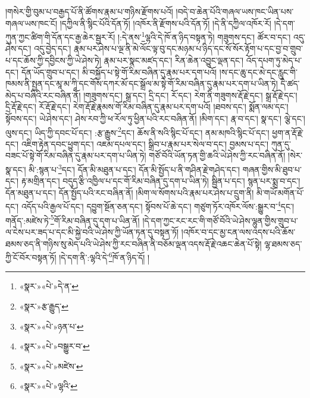 །གསེར་གྱི་བུམ་པ་བརྒྱད་པོ་ནི་ཚོགས་རྣམ་པ་གཉིས་རྫོགས་པའོ། །བདེ་བ་ཆེན་པོའི་གཞལ་ཡས་ཁང་ཡིན་པས་གཞལ་ཡས་ཁང་ངོ། །དཀྱིལ་ནི་སྙིང་པོའི་དོན་ཏོ། །འཁོར་ནི་རྫོགས་པའི་དོན་ཏོ། །དེ་ནི་དཀྱིལ་འཁོར་རོ། །དེ་དག་ཀུན་ཀྱང་ཚིག་གི་དོན་དང་རྒྱ་ཆེར་སྦྱར་རོ། །:དེ་ནས་\footnote{«སྣར་»«པེ་»དེ་ན་}ལྷའི་དེ་ཁོ་ན་ཉིད་བསྟན་ཏེ། གཟུགས་དང་། ཚོར་བ་དང་། འདུ་ཤེས་དང་། འདུ་བྱེད་དང་། རྣམ་པར་ཤེས་པ་ལྔ་ནི་མེ་ལོང་ལྟ་བུ་དང་མཉམ་པ་ཉིད་དང་སོ་སོར་རྟོག་པ་དང་བྱ་བ་གྲུབ་པ་དང་ཆོས་ཀྱི་དབྱིངས་ཀྱི་ཡེ་ཤེས་ཏེ། རྣམ་པར་སྣང་མཛད་དང་། རིན་ཆེན་འབྱུང་ལྡན་དང་། འོད་དཔག་ཏུ་མེད་པ་དང་། དོན་ཡོད་གྲུབ་པ་དང་། མི་བསྐྱོད་པ་སྟེ་གོ་རིམ་བཞིན་དུ་རྣམ་པར་དག་པའོ། །ས་དང་ཆུ་དང་མེ་དང་རླུང་གི་ཁམས་ནི་སྤྱན་དང་མཱ་མ་ཀཱི་དང་གོས་དཀར་མོ་དང་སྒྲོལ་མ་སྟེ་གོ་རིམ་བཞིན་དུ་རྣམ་པར་དག་པ་ཡིན་ཏེ། དེ་ཚད་མེད་པ་བཞིའི་རང་བཞིན་ནོ། །གཟུགས་དང་། སྒྲ་དང་། དྲི་དང་། རོ་དང་། རེག་ནི་གཟུགས་རྡོ་རྗེ་དང་། སྒྲ་རྡོ་རྗེ་དང་། དྲི་རྡོ་རྗེ་དང་། རོ་རྡོ་རྗེ་དང་། རེག་རྡོ་རྗེ་རྣམས་གོ་རིམ་བཞིན་དུ་རྣམ་པར་དག་པའོ། །ཐབས་དང་། སྨོན་ལམ་དང་། སྟོབས་དང་། ཡེ་ཤེས་དང་། ཤེས་རབ་ཀྱི་ཕ་རོལ་ཏུ་ཕྱིན་པའི་རང་བཞིན་ནོ། །མིག་དང་། རྣ་བ་དང་། སྣ་དང་། ལྕེ་དང་། ལུས་དང་། ཡིད་ཀྱི་དབང་པོ་དང་། :རྩ་རྒྱུས་\footnote{«སྣར་»རྩ་རྒྱུད་}དང་། ཆོས་ནི་སའི་སྙིང་པོ་དང་། ནམ་མཁའི་སྙིང་པོ་དང་། ཕྱག་ན་རྡོ་རྗེ་དང་། འཇིག་རྟེན་དབང་ཕྱུག་དང་། འཇམ་དཔལ་དང་། སྒྲིབ་པ་རྣམ་པར་སེལ་བ་དང་། བྱམས་པ་དང་། ཀུན་དུ་བཟང་པོ་སྟེ་གོ་རིམ་བཞིན་དུ་རྣམ་པར་དག་པ་ཡིན་ཏེ། གཙོ་བོའི་ཡོན་ཏན་གྱི་ཆའི་ཡེ་ཤེས་ཀྱི་རང་བཞིན་ནོ། །སེར་སྣ་དང་། མི་:སྙན་པ་\footnote{«སྣར་»«པེ་»ཉན་པ་}དང་། དོན་མི་མཐུན་པ་དང་། དོན་མི་སྤྱོད་པ་ནི་གཤིན་རྗེ་གཤེད་དང་། གཞན་གྱིས་མི་ཐུབ་པ་དང་། རྟ་མགྲིན་དང་། བདུད་རྩི་འཁྱིལ་པ་དང་གོ་རིམ་བཞིན་དུ་དག་པ་ཡིན་ཏེ། སྦྱིན་པ་དང་། སྙན་པར་སྨྲ་བ་དང་། དོན་མཐུན་པ་དང་། དོན་སྤྱོད་པའི་རང་བཞིན་ནོ། །མིག་ལ་སོགས་པའི་རྣམ་པར་ཤེས་པ་དྲུག་ནི། མི་གཡོ་མགོན་པོ་དང་། འདོད་པའི་རྒྱལ་པོ་དང་། དབྱུག་སྔོན་ཅན་དང་། སྟོབས་པོ་ཆེ་དང་། གཙུག་ཏོར་འཁོར་ལོས་:སྒྱུར་བ་\footnote{«སྣར་»«པེ་»བསྒྱུར་བ་}དང་། གནོད་:མཛེས་ཏེ་\footnote{«སྣར་»«པེ་»མཛེས་}གོ་རིམ་བཞིན་དུ་དག་པ་ཡིན་ནོ། །དེ་དག་ཀྱང་རང་རང་གི་གཙོ་བོའི་ཡེ་ཤེས་ལྷུན་གྱིས་གྲུབ་པ་ལ་ངེས་པར་ཟད་པ་དང་མི་སྐྱེ་བའི་ཡེ་ཤེས་ཀྱི་ཡོན་ཏན་དུ་བསྟན་ཏོ། །འཁོར་བ་དང་མྱ་ངན་ལས་འདས་པའི་ཆོས་ཐམས་ཅད་ནི་གཉིས་སུ་མེད་པའི་ཡེ་ཤེས་ཀྱི་རང་བཞིན་ནི་བཅོམ་ལྡན་འདས་རྡོ་རྗེ་འཆང་ཆེན་པོ་སྟེ། ལྷ་ཐམས་ཅད་ཀྱི་ངོ་བོར་བསྟན་ཏོ། །དེ་དག་ནི་:ལྷའི་དེ་\footnote{«སྣར་»«པེ་»ལྷའི་}ཁོ་ན་ཉིད་དོ། །
